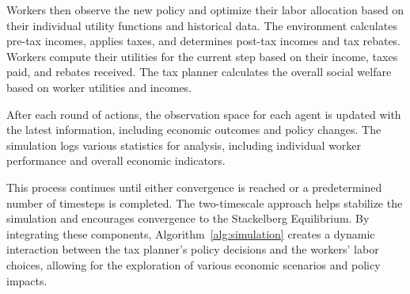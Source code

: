 Workers then observe the new policy and optimize their labor allocation based on their individual utility functions and historical data. The environment calculates pre-tax incomes, applies taxes, and determines post-tax incomes and tax rebates. Workers compute their utilities for the current step based on their income, taxes paid, and rebates received. The tax planner calculates the overall social welfare based on worker utilities and incomes.

After each round of actions, the observation space for each agent is updated with the latest information, including economic outcomes and policy changes. The simulation logs various statistics for analysis, including individual worker performance and overall economic indicators.

This process continues until either convergence is reached or a predetermined number of timesteps is completed. The two-timescale approach helps stabilize the simulation and encourages convergence to the Stackelberg Equilibrium. By integrating these components, Algorithm~\ref{alg:simulation} creates a dynamic interaction between the tax planner's policy decisions and the workers' labor choices, allowing for the exploration of various economic scenarios and policy impacts.